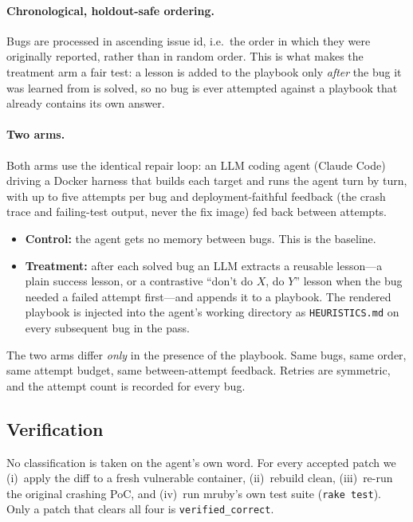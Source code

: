 \documentclass[11pt]{article}
\begin{document}
\paragraph{Chronological, holdout-safe ordering.} Bugs are processed in ascending
issue id, i.e.\ the order in which they were originally reported, rather than in
random order. This is what makes the treatment arm a fair test: a lesson is added
to the playbook only \emph{after} the bug it was learned from is solved, so no bug
is ever attempted against a playbook that already contains its own answer.

\paragraph{Two arms.} Both arms use the identical repair loop: an LLM coding agent
(Claude Code) driving a Docker harness that builds each target and runs the agent
turn by turn, with up to five attempts per bug and deployment-faithful feedback
(the crash trace and failing-test output, never the fix image) fed back between
attempts.
\begin{itemize}
  \item \textbf{Control:} the agent gets no memory between bugs. This is the
  baseline.
  \item \textbf{Treatment:} after each solved bug an LLM extracts a reusable
  lesson---a plain success lesson, or a contrastive ``don't do $X$, do $Y$''
  lesson when the bug needed a failed attempt first---and appends it to a
  playbook. The rendered playbook is injected into the agent's working directory
  as \texttt{HEURISTICS.md} on every subsequent bug in the pass.
\end{itemize}
The two arms differ \emph{only} in the presence of the playbook. Same bugs, same
order, same attempt budget, same between-attempt feedback. Retries are symmetric,
and the attempt count is recorded for every bug.

\subsection{Verification}
\label{sec:verify}

No classification is taken on the agent's own word. For every accepted patch we
(i)~apply the diff to a fresh vulnerable container, (ii)~rebuild clean, (iii)~re-run
the original crashing PoC, and (iv)~run mruby's own test suite (\texttt{rake
test}). Only a patch that clears all four is \texttt{verified\_correct}.
\end{document}
